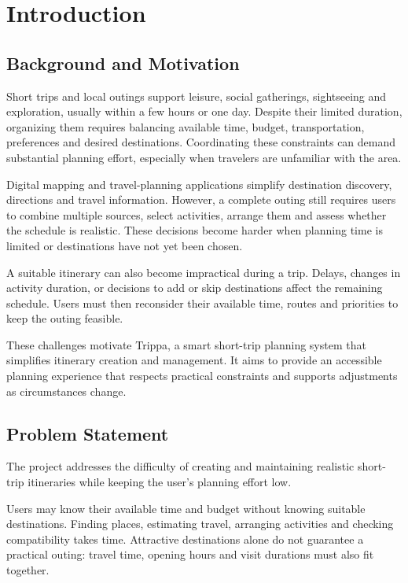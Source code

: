 \chapter{Introduction}
\label{ch:introduction}
\section{Background and Motivation}

Short trips and local outings support leisure, social gatherings, sightseeing and exploration, usually within a few hours or one day. Despite their limited duration, organizing them requires balancing available time, budget, transportation, preferences and desired destinations. Coordinating these constraints can demand substantial planning effort, especially when travelers are unfamiliar with the area.


Digital mapping and travel-planning applications simplify destination discovery, directions and travel information. However, a complete outing still requires users to combine multiple sources, select activities, arrange them and assess whether the schedule is realistic. These decisions become harder when planning time is limited or destinations have not yet been chosen.


A suitable itinerary can also become impractical during a trip. Delays, changes in activity duration, or decisions to add or skip destinations affect the remaining schedule. Users must then reconsider their available time, routes and priorities to keep the outing feasible.


These challenges motivate Trippa, a smart short-trip planning system that simplifies itinerary creation and management. It aims to provide an accessible planning experience that respects practical constraints and supports adjustments as circumstances change.


\section{Problem Statement}

The project addresses the difficulty of creating and maintaining realistic short-trip itineraries while keeping the user's planning effort low.


Users may know their available time and budget without knowing suitable destinations. Finding places, estimating travel, arranging activities and checking compatibility takes time. Attractive destinations alone do not guarantee a practical outing: travel time, opening hours and visit durations must also fit together.


